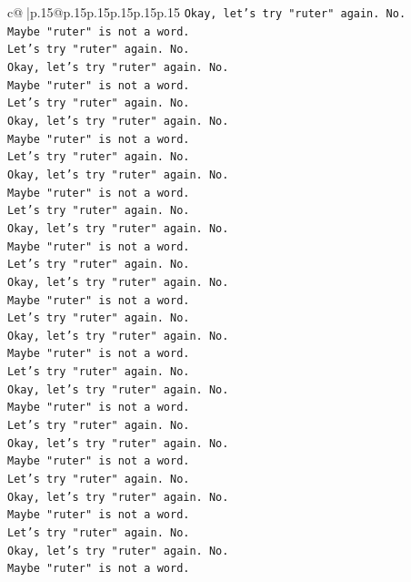 \documentclass{article}
\begin{document}
{\begin{supertabular}{c@{$\;$}|p{.15\linewidth}@{}p{.15\linewidth}p{.15\linewidth}p{.15\linewidth}p{.15\linewidth}p{.15\linewidth}}
{{{\texttt{Okay, let's try "ruter" again. No.} \\
\texttt{Maybe "ruter" is not a word.} \\
\texttt{Let's try "ruter" again. No.} \\
\texttt{Okay, let's try "ruter" again. No.} \\
\texttt{Maybe "ruter" is not a word.} \\
\texttt{Let's try "ruter" again. No.} \\
\texttt{Okay, let's try "ruter" again. No.} \\
\texttt{Maybe "ruter" is not a word.} \\
\texttt{Let's try "ruter" again. No.} \\
\texttt{Okay, let's try "ruter" again. No.} \\
\texttt{Maybe "ruter" is not a word.} \\
\texttt{Let's try "ruter" again. No.} \\
\texttt{Okay, let's try "ruter" again. No.} \\
\texttt{Maybe "ruter" is not a word.} \\
\texttt{Let's try "ruter" again. No.} \\
\texttt{Okay, let's try "ruter" again. No.} \\
\texttt{Maybe "ruter" is not a word.} \\
\texttt{Let's try "ruter" again. No.} \\
\texttt{Okay, let's try "ruter" again. No.} \\
\texttt{Maybe "ruter" is not a word.} \\
\texttt{Let's try "ruter" again. No.} \\
\texttt{Okay, let's try "ruter" again. No.} \\
\texttt{Maybe "ruter" is not a word.} \\
\texttt{Let's try "ruter" again. No.} \\
\texttt{Okay, let's try "ruter" again. No.} \\
\texttt{Maybe "ruter" is not a word.} \\
\texttt{Let's try "ruter" again. No.} \\
\texttt{Okay, let's try "ruter" again. No.} \\
\texttt{Maybe "ruter" is not a word.} \\
\texttt{Let's try "ruter" again. No.} \\
\texttt{Okay, let's try "ruter" again. No.} \\
\texttt{Maybe "ruter" is not a word.} \\
}}}
\end{supertabular}}
\end{document}
